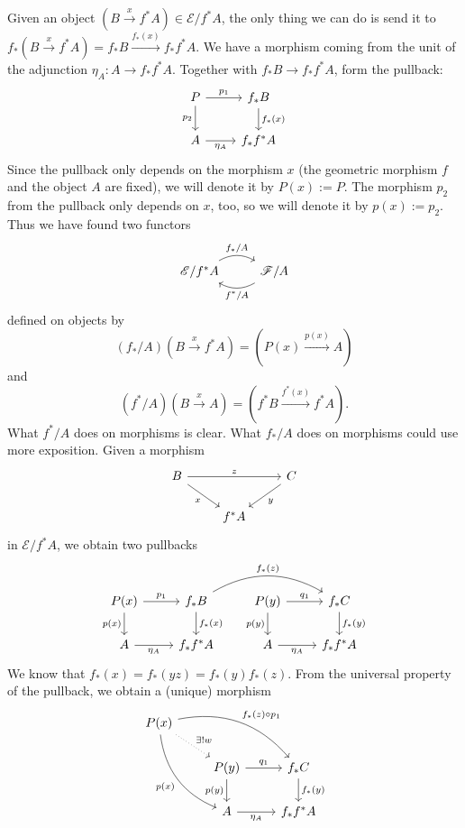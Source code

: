 Given an object $(B \xrightarrow{x} f^*A) \in \mathscr{E}/f^*A$, the only thing we can do is send it to $f_*(B \xrightarrow{x} f^*A) = f_*B \xrightarrow{f_*(x)} f_* f^*A$. We have a morphism coming from the unit of the adjunction $\eta_A : A \to f_* f^* A$. Together with $f_*B \to f_* f^*A$, form the pullback:
\[
\begin{tikzcd}
P \arrow[r, "p_1"] \arrow[d, swap, "p_2"] & f_*B \arrow[d, "f_*(x)"] \\
A \arrow[r, swap, "\eta_A"] & f_*f^*A
\end{tikzcd}\]
Since the pullback only depends on the morphism $x$ (the geometric morphism $f$ and the object $A$ are fixed), we will denote it by $P(x) := P$. The morphism $p_2$ from the pullback only depends on $x$, too, so we will denote it by $p(x) := p_2$.
Thus we have found two functors
\[ \begin{tikzcd} \mathscr{E} / f^*A \arrow[r, bend left, "f_*/A"] & \mathscr{F}/A \arrow[l, bend left, "f^*/A"] \end{tikzcd} \]
defined on objects by
\[ \left( f_*/A \right) \left(B \xrightarrow{x} f^*A \right) = \left( P(x) \xrightarrow{p(x)} A \right) \]
and
\[ \left(f^*/A \right) \left( B \xrightarrow{x} A \right) = \left( f^*B \xrightarrow{f^*(x)} f^*A \right). \]
What $f^*/A$ does on morphisms is clear. What $f_*/A$ does on morphisms could use more exposition. Given a morphism
\[ \begin{tikzcd}
B \arrow[rr, "z"] \arrow[dr, swap, "x"] & & C \arrow[dl, "y"] \\
& f^*A &
\end{tikzcd} \]
in $\mathscr{E}/f^*A$, we obtain two pullbacks
\[\begin{tikzcd}
P(x) \arrow[r, "p_1"] \arrow[d, swap, "p(x)"] & f_*B \arrow[d, "f_*(x)"] \arrow[rr, bend left, "f_*(z)"] & P(y) \arrow[r, "q_1"] \arrow[d, swap, "p(y)"] & f_*C \arrow[d, "f_*(y)"] \\
A \arrow[r, swap, "\eta_A"] & f_*f^*A & A \arrow[r, swap, "\eta_A"] & f_*f^*A
\end{tikzcd}\]
We know that $f_*(x) = f_*(yz) = f_*(y) f_*(z)$. From the universal property of the pullback, we obtain a (unique) morphism
\[\begin{tikzcd}
P(x) \arrow[dr, dotted, "\exists! w"] \arrow[ddr, bend right, swap, "p(x)"] \arrow[drr, bend left, "f_*(z) \circ p_1"] \\
& P(y) \arrow[r, "q_1"] \arrow[d, swap, "p(y)"] & f_*C \arrow[d, "f_*(y)"] \\
& A \arrow[r, swap, "\eta_A"] & f_*f^*A
\end{tikzcd}\]
